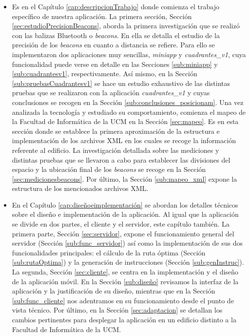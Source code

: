 \begin{itemize}
	\item Es en el Capítulo \ref{cap:descripcionTrabajo} donde comienza el trabajo específico de nuestra aplicación. La primera sección, Sección \ref{sec:estudioPrecisionBeacons}, aborda la primera investigación que se realizó con las balizas Bluetooth o \textit{beacons}. En ella se detalla el estudio de la precisión de los \textit{beacons} en cuanto a distancia se refiere. Para ello se implementaron dos aplicaciones muy sencillas, \textit{miniapp} y \textit{cuadrantes\_v1}, cuya funcionalidad puede verse en detalle en las Secciones \ref{sub:miniapp} y \ref{sub:cuadrantesv1}, respectivamente. Así mismo, en la Sección \ref{sub:pruebasCuadrantesv1} se hace un estudio exhaustivo de las distintas pruebas que se realizaron con la aplicación \textit{cuadrantes\_v1} y cuyas conclusiones se recogen en la Sección \ref{sub:conclusiones_posicionam}. Una vez analizada la tecnología y estudiado su comportamiento, comienza el mapeo de la Facultad de Informática de la UCM en la Sección \ref{sec:mapeo}. Es en esta sección donde se establece la primera aproximación de la estructura e implementación de los archivos XML en los cuales se recoge la información referente al edificio. La investigación detallada sobre las mediciones y distintas pruebas que se llevaron a cabo para establecer las divisiones del espacio y la ubicación final de los \textit{beacons} se recoge en la Sección \ref{sec:medicionesbeacons}. Por último, la Sección \ref{sub:mapeo_xml} expone la estructura de los mencionados archivos XML.
	
	\item En el Capítulo \ref{cap:diseñoeimplementación} se abordan los detalles técnicos sobre el diseño e implementación de la aplicación. Al igual que la aplicación se divide en dos partes, el cliente y el servidor, este capítulo también. La primera parte, Sección \ref{sec:servidor}, expone el funcionamiento general del servidor (Sección \ref{sub:func_servidor}) así como la implementación de sus dos funcionalidades principales: el cálculo de la ruta óptima (Sección \ref{sub:rutaOptima}) y la generación de instrucciones (Sección \ref{sub:genInstruc}). La segunda, Sección \ref{sec:cliente}, se centra en la implementación y el diseño de la aplicación móvil. En la Sección \ref{sub:diseño} revisamos la interfaz de la aplicación y la justificación de su diseño, mientras que en la Sección \ref{sub:func_cliente} nos adentramos en su funcionamiento desde el punto de vista técnico. Por último, en la Sección \ref{sec:adaptacion} se detallan los cambios pertinentes para desplegar la aplicación en un edificio distinto a la Facultad de Informática de la UCM.
	

\end{itemize}
